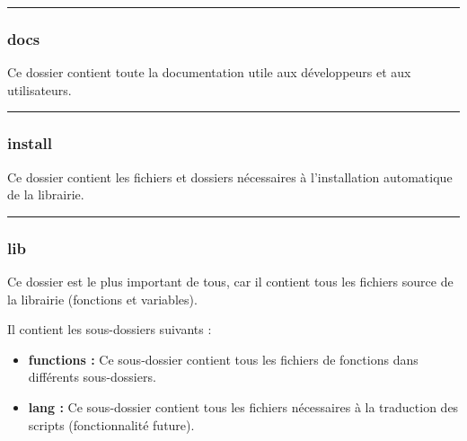 \documentclass[a4paper,10pt]{article}
\begin{document}

\color{sec3}\par\noindent\rule{\textwidth}{0.4pt}\color{text}

\color{sec3}
\subsubsection{docs}\color{text}

\begin{justify}
    Ce dossier contient toute la documentation utile aux développeurs et aux utilisateurs.
\end{justify}


\color{sec3}\par\noindent\rule{\textwidth}{0.4pt}\color{text}

\color{sec3}
\subsubsection{install}\color{text}

\begin{justify}
    Ce dossier contient les fichiers et dossiers nécessaires à l'installation automatique de la librairie.
\end{justify}


\color{sec3}\par\noindent\rule{\textwidth}{0.4pt}\color{text}

\color{sec3}
\subsubsection{lib}\color{text}

\begin{justify}
    Ce dossier est le plus important de tous, car il contient tous les fichiers source de la librairie (fonctions et variables).
\end{justify}


\begin{justify}
    Il contient les sous-dossiers suivants :

    \begin{itemize}
        \item \textbf{\color{path}functions\color{text} :} Ce sous-dossier contient tous les fichiers de fonctions dans différents sous-dossiers.\\\mbox{}

        \item \textbf{\color{path}lang\color{text} :} Ce sous-dossier contient tous les fichiers nécessaires à la traduction des scripts (fonctionnalité future).
    \end{itemize}
\end{justify}
\end{document}
